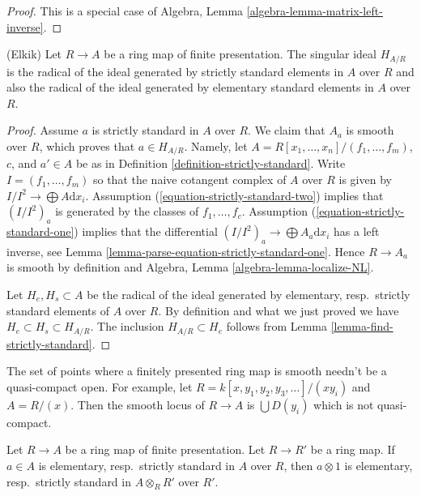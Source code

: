 \begin{proof}
This is a special case of
Algebra, Lemma \ref{algebra-lemma-matrix-left-inverse}.
\end{proof}

\begin{lemma}
\label{lemma-elkik}
(Elkik) Let $R \to A$ be a ring map of finite presentation.
The singular ideal $H_{A/R}$ is the radical of the ideal
generated by strictly standard elements in $A$ over $R$
and also the radical of the ideal generated by elementary
standard elements in $A$ over $R$.
\end{lemma}

\begin{proof}
Assume $a$ is strictly standard in $A$ over $R$. We claim that
$A_a$ is smooth over $R$, which proves that $a \in H_{A/R}$. Namely,
let $A = R[x_1, \ldots, x_n]/(f_1, \ldots, f_m)$, $c$, and $a' \in A$
be as in Definition \ref{definition-strictly-standard}.
Write $I = (f_1, \ldots, f_m)$ so that the naive cotangent
complex of $A$ over $R$ is given by $I/I^2 \to \bigoplus A\text{d}x_i$.
Assumption (\ref{equation-strictly-standard-two})
implies that $(I/I^2)_a$ is generated by the classes of $f_1, \ldots, f_c$.
Assumption (\ref{equation-strictly-standard-one}) implies
that the differential $(I/I^2)_a \to \bigoplus A_a\text{d}x_i$
has a left inverse, see
Lemma \ref{lemma-parse-equation-strictly-standard-one}.
Hence $R \to A_a$ is smooth by definition and
Algebra, Lemma \ref{algebra-lemma-localize-NL}.

\medskip\noindent
Let $H_e, H_s \subset A$ be the radical of the ideal generated by
elementary, resp.\ strictly standard elements of $A$ over $R$.
By definition and what we just proved we have
$H_e \subset H_s \subset H_{A/R}$. The inclusion $H_{A/R} \subset H_e$
follows from Lemma \ref{lemma-find-strictly-standard}.
\end{proof}

\begin{example}
\label{example-not-quasi-compact}
The set of points where a finitely presented ring map is smooth
needn't be a quasi-compact open. For example, let
$R = k[x, y_1, y_2, y_3, \ldots]/(xy_i)$ and $A = R/(x)$.
Then the smooth locus of $R \to A$ is
$\bigcup D(y_i)$ which is not quasi-compact.
\end{example}

\begin{lemma}
\label{lemma-strictly-standard-base-change}
Let $R \to A$ be a ring map of finite presentation.
Let $R \to R'$ be a ring map. If $a \in A$ is elementary,
resp.\ strictly standard in $A$ over $R$, then $a \otimes 1$
is elementary, resp.\ strictly standard in $A \otimes_R R'$ over $R'$.
\end{lemma}

